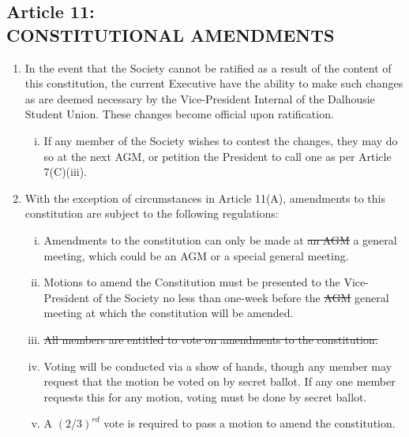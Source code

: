 \documentclass[]{report}
\begin{document}
\clearpage
\begin{center}
	\section*{Article 11:\\CONSTITUTIONAL AMENDMENTS}
	\vspace{12px}
\end{center}
\label{amendments}

	\renewcommand{\theenumi}{\Alph{enumi}}
	\begin{enumerate}
	
		\item In the event that the Society cannot be ratified as a result of the content of this constitution, the current Executive have the ability to make such changes as are deemed necessary by the Vice-President Internal of the Dalhousie Student Union. These changes become official upon ratification.
			\begin{enumerate}[i.]
				\item If any member of the Society wishes to contest the changes, they may do so at the next AGM, or petition the President to call one as per Article 7(C)(iii).
			\end{enumerate}
		
		\item With the exception of circumstances in Article 11(A), amendments to this constitution are subject to the following regulations:
			\begin{enumerate}[i.]
				\item Amendments to the constitution can only be made at \st{an AGM} \color{red} a general meeting, which could be an AGM or a special general meeting.\color{black}
				\item Motions to amend the Constitution must be presented \color{red}{by interested members of the general membership} \color{black} to the Vice-President \color{red}{Internal} \color{black} of the Society no less than one-week before the \st{AGM} \color{red} general meeting \color{black} at which the constitution will be amended.
				\item \st{All members are entitled to vote on amendments to the constitution.}\\
				\color{red}{All voting members of the general membership, except honorary members, are entitled to vote on amendments to the constitution.}\color{black}
				\item Voting will be conducted via a show of hands, though any member may request that the motion be voted on by secret ballot. If any one member requests this for any motion, voting must be done by secret ballot.
				\item A $ (2/3)^{rd} $ vote \color{red}{of those present and voting, including proxies,} \color{black} is required to pass a motion to amend the constitution.
			\end{enumerate}
	
	\end{enumerate}
\end{document}
